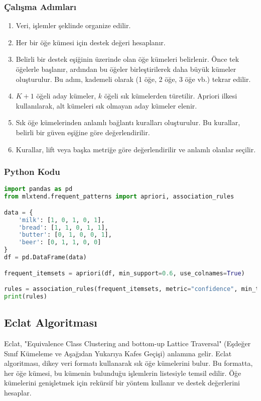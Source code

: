 \subsubsection{Çalışma Adımları}

\begin{enumerate}
	\item Veri, işlemler şeklinde organize edilir.
	\item Her bir öğe kümesi için destek değeri hesaplanır.
	\item Belirli bir destek eşiğinin üzerinde olan öğe kümeleri belirlenir. Önce tek öğelerle başlanır, ardından bu öğeler birleştirilerek daha büyük kümeler oluşturulur. Bu adım, kademeli olarak (1 öğe, 2 öğe, 3 öğe vb.) tekrar edilir.
	\item $K+1$ öğeli aday kümeler, $k$ öğeli sık kümelerden türetilir. Apriori ilkesi kullanılarak, alt kümeleri sık olmayan aday kümeler elenir.
	\item Sık öğe kümelerinden anlamlı bağlantı kuralları oluşturulur. Bu kurallar, belirli bir güven eşiğine göre değerlendirilir.
	\item Kurallar, lift veya başka metriğe göre değerlendirilir ve anlamlı olanlar seçilir.
\end{enumerate}

\subsubsection{Python Kodu}

\begin{lstlisting}[language=Python]
import pandas as pd
from mlxtend.frequent_patterns import apriori, association_rules

data = {
    'milk': [1, 0, 1, 0, 1],
    'bread': [1, 1, 0, 1, 1],
    'butter': [0, 1, 0, 0, 1],
    'beer': [0, 1, 1, 0, 0]
}
df = pd.DataFrame(data)

frequent_itemsets = apriori(df, min_support=0.6, use_colnames=True)

rules = association_rules(frequent_itemsets, metric="confidence", min_threshold=0.7)
print(rules)
\end{lstlisting}

\subsection{Eclat Algoritması}
Eclat, "Equivalence Class Clustering and bottom-up Lattice Traversal" (Eşdeğer Sınıf Kümeleme ve Aşağıdan Yukarıya Kafes Geçişi) anlamına gelir. Eclat algoritması, dikey veri formatı kullanarak sık öğe kümelerini bulur. Bu formatta, her öğe kümesi, bu kümenin bulunduğu işlemlerin listesiyle temsil edilir. Öğe kümelerini genişletmek için rekürsif bir yöntem kullanır ve destek değerlerini hesaplar.


